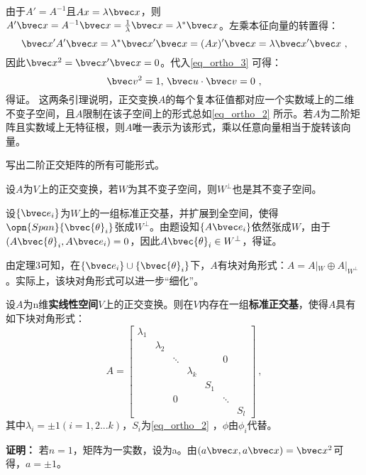 由于$A'=A^{-1}$且$Ax=\lambda \bvec x$，则$A'\bvec x=A^{-1}\bvec x=\frac{1}{\lambda}\bvec x=\lambda^* \bvec x$。左乘本征向量的转置得：
\begin{equation}
\bvec x'A'\bvec x=\lambda^* \bvec x'\bvec x=(Ax)'\bvec x=\lambda \bvec x'\bvec x~,
\end{equation}
因此$\bvec x^2=\bvec x'\bvec x=0$。代入\autoref{eq_ortho_3} 可得：
\begin{equation}
\bvec v^2=1,\,\bvec u\cdot \bvec v=0~,
\end{equation}
得证。
这两条引理说明，正交变换$A$的每个复本征值都对应一个实数域上的二维不变子空间，且$A$限制在该子空间上的形式总如\autoref{eq_ortho_2} 所示。若$A$为二阶矩阵且实数域上无特征根，则$A$唯一表示为该形式，乘以任意向量相当于旋转该向量。
\begin{exercise}{}
写出二阶正交矩阵的所有可能形式。
\end{exercise}
\begin{lemma}{}\label{lem_ortho_2}
设$A$为$V$上的正交变换，若$W$为其不变子空间，则$W^{\bot}$也是其不变子空间。
\end{lemma}
设$\{\bvec e_i\}$为$W$上的一组标准正交基，并扩展到全空间，使得$\opn{Span}\{\bvec {\theta}_i\}$张成$W^{\bot}$。由题设知$\{A\bvec e_i\}$依然张成$W$，由于$(A\bvec {\theta}_i,A\bvec e_i)=0$，因此$A\bvec{\theta}_i\in W^{\bot}$，得证。

由定理3可知，在$\{\bvec e_i\}\cup\{\bvec {\theta}_i\}$下，$A$有块对角形式：$A=A|_W\oplus A|_{W^{\bot}}$。实际上，该块对角形式可以进一步“细化”。
\begin{theorem}{}
设$A$为n维\textbf{实线性空间}$V$上的正交变换。则在$V$内存在一组\textbf{标准正交基}，使得$A$具有如下块对角形式：
\begin{equation}
A=\left[\begin{array}{lllllll}
\lambda_1 & & & & & & \\
& \lambda_2 & & & & & \\
& & \ddots & & & 0 & \\
& & & \lambda_k & & & \\
& & & & S_1 & & \\
& & 0 & & & \ddots & \\
& & & & & & S_l
\end{array}\right]~,
\end{equation}
其中$\lambda_i=\pm 1(i=1,2...k)$，$S_i$为\autoref{eq_ortho_2} ，$\phi$由$\phi_i$代替。
\end{theorem}
\textbf{证明：}
若$n=1$，矩阵为一实数，设为a。由$(a\bvec x,a\bvec x)=\bvec x^2$可得，$a=\pm 1$。

